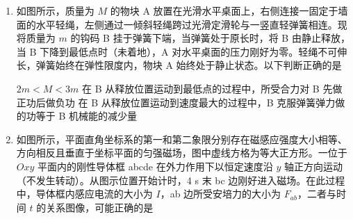 \documentclass[\gkver]{gaokaozhenti}
\begin{document}
\begin{enumerate}
{由对称性知，d 点的电势低于 c 点，由上述分析可知，带负电的试探电荷在 c 点的电势能小于在 d 点的电势能，故 D 正确。

故选 BD。

}

\item
如图所示，质量为 $M$ 的物块 A 放置在光滑水平桌面上，右侧连接一固定于墙面的水平轻绳，左侧通过一倾斜轻绳跨过光滑定滑轮与一竖直轻弹簧相连。现将质量为 $m$ 的钩码 B 挂于弹簧下端，当弹簧处于原长时，将 B 由静止释放，当 B 下降到最低点时（未着地），A 对水平桌面的压力刚好为零。轻绳不可伸长，弹簧始终在弹性限度内，物块 A 始终处于静止状态。以下判断正确的是


{$2m<M<3m$}
{在 B 从释放位置运动到最低点的过程中，所受合力对 B 先做正功后做负功}
{在 B 从释放位置运动到速度最大的过程中，B 克服弹簧弹力做的功等于 B 机械能的减少量}


\item
如图所示，平面直角坐标系的第一和第二象限分别存在磁感应强度大小相等、方向相反且垂直于坐标平面的匀强磁场，图中虚线方格为等大正方形。一位于 $Oxy$ 平面内的刚性导体框 abcde 在外力作用下以恒定速度沿 $y$ 轴正方向运动（不发生转动）。从图示位置开始计时，4 s 末 bc 边刚好进入磁场。在此过程中，导体框内感应电流的大小为 $I$，ab 边所受安培力的大小为 $F_{ab}$，二者与时间 $t$ 的关系图像，可能正确的是


\end{enumerate}
\end{document}
